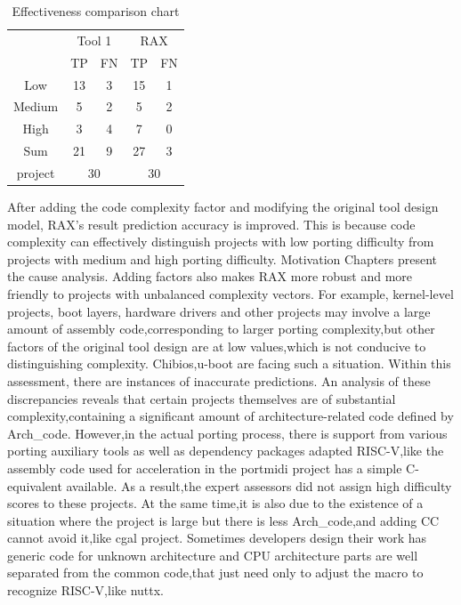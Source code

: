 \documentclass[sigconf,screen,review,anonymous]{acmart}
\begin{document}
\begin{table}
  \caption{Effectiveness comparison chart}
  \label{tab:effectiveness}
  \begin{tabular}{ccccc}
    \toprule
     & \multicolumn{2}{c}{Tool 1} & \multicolumn{2}{c}{RAX} \\
     & TP & FN & TP & FN \\
    \midrule
    Low & 13 & 3 & 15 & 1 \\
    Medium & 5 & 2 & 5 & 2 \\
    High & 3 & 4 & 7 & 0 \\
    Sum & 21 & 9 & 27 & 3 \\
    project & \multicolumn{2}{c}{30} & \multicolumn{2}{c}{30} \\
  \bottomrule
\end{tabular}
\end{table}

After adding the code complexity factor and modifying the original tool design model, RAX's result prediction accuracy is improved.
This is because code complexity can effectively distinguish projects with low porting difficulty from projects with medium and high porting difficulty.
Motivation Chapters present the cause analysis.
Adding factors also makes RAX more robust and more friendly to projects with unbalanced complexity vectors.
For example, kernel-level projects, boot layers, hardware drivers and other projects may involve a large amount of assembly code,corresponding to larger porting complexity,but other factors of the original tool design are at low values,which is not conducive to distinguishing complexity.
Chibios,u-boot are facing such a situation.
Within this assessment, there are instances of inaccurate predictions.
An analysis of these discrepancies reveals that certain projects themselves are of substantial complexity,containing a significant amount of architecture-related code defined by Arch\_code.
However,in the actual porting process, there is support from various porting auxiliary tools as well as dependency packages adapted RISC-V,like the assembly code used for acceleration in the portmidi project has a simple C- equivalent available.
As a result,the expert assessors did not assign high difficulty scores to these projects.
At the same time,it is also due to the existence of a situation where the project is large but there is less Arch\_code,and adding CC cannot avoid it,like cgal project.
Sometimes developers design their work has generic code for unknown architecture and CPU architecture parts are well separated from the common code,that just need only to adjust the macro to recognize RISC-V,like nuttx.
\end{document}
